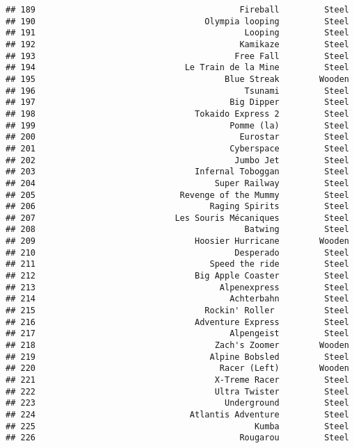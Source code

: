 \documentclass[
]{article}
\begin{document}
\begin{verbatim}
## 189                                         Fireball         Steel
## 190                                  Olympia looping         Steel
## 191                                          Looping         Steel
## 192                                         Kamikaze         Steel
## 193                                        Free Fall         Steel
## 194                              Le Train de la Mine         Steel
## 195                                      Blue Streak        Wooden
## 196                                          Tsunami         Steel
## 197                                       Big Dipper         Steel
## 198                                Tokaido Express 2         Steel
## 199                                       Pomme (la)         Steel
## 200                                         Eurostar         Steel
## 201                                       Cyberspace         Steel
## 202                                        Jumbo Jet         Steel
## 203                                Infernal Toboggan         Steel
## 204                                    Super Railway         Steel
## 205                             Revenge of the Mummy         Steel
## 206                                   Raging Spirits         Steel
## 207                            Les Souris Mécaniques         Steel
## 208                                          Batwing         Steel
## 209                                Hoosier Hurricane        Wooden
## 210                                        Desperado         Steel
## 211                                   Speed the ride         Steel
## 212                                Big Apple Coaster         Steel
## 213                                     Alpenexpress         Steel
## 214                                       Achterbahn         Steel
## 215                                  Rockin' Roller          Steel
## 216                                Adventure Express         Steel
## 217                                       Alpengeist         Steel
## 218                                    Zach's Zoomer        Wooden
## 219                                   Alpine Bobsled         Steel
## 220                                     Racer (Left)        Wooden
## 221                                    X-Treme Racer         Steel
## 222                                    Ultra Twister         Steel
## 223                                      Underground         Steel
## 224                               Atlantis Adventure         Steel
## 225                                            Kumba         Steel
## 226                                         Rougarou         Steel

\end{verbatim}
\end{document}
